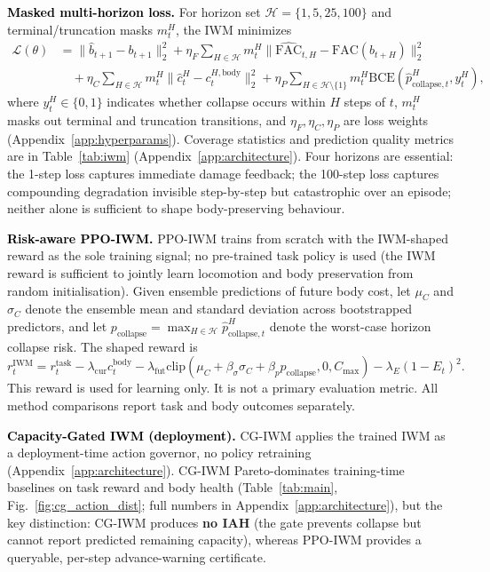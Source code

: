 \documentclass{article}
\newcommand{\methodsec}[1]{\noindent\textcolor{black}{\textbf{#1}}\enspace}
\newcommand{\fac}{\mathrm{FAC}}
\newcommand{\body}{b}
\newcommand{\bodycost}{c^{\mathrm{body}}}
\newcommand{\task}{r^{\mathrm{task}}}
\begin{document}
{\methodsec{Masked multi-horizon loss.}
For horizon set $\mathcal{H}=\{1,5,25,100\}$ and terminal/truncation masks $m^H_t$, the IWM minimizes
\begin{align}
    \mathcal{L}(\theta)
    &=
    \|\hat{\body}_{t+1}-\body_{t+1}\|_2^2
    + \eta_F \sum_{H\in\mathcal{H}} m^H_t
    \|\widehat{\fac}_{t,H}-\fac(\body_{t+H})\|_2^2 \nonumber\\
    &\quad
    + \eta_C \sum_{H\in\mathcal{H}} m^H_t
    \|\hat c^{H}_{t}-c^{H,\mathrm{body}}_{t}\|_2^2
    + \eta_P \sum_{H\in\mathcal{H}\setminus\{1\}} m^H_t
    \mathrm{BCE}(\hat p^{H}_{\mathrm{collapse},t}, y^H_t),
\end{align}
where $y^H_t \in \{0,1\}$ indicates whether collapse occurs within $H$ steps of $t$, $m^H_t$ masks out terminal and truncation transitions, and $\eta_F,\eta_C,\eta_P$ are loss weights (Appendix~\ref{app:hyperparams}). Coverage statistics and prediction quality metrics are in Table~\ref{tab:iwm} (Appendix~\ref{app:architecture}).
Four horizons are essential: the 1-step loss captures immediate damage feedback; the 100-step loss captures compounding degradation invisible step-by-step but catastrophic over an episode; neither alone is sufficient to shape body-preserving behaviour.

\methodsec{Risk-aware PPO-IWM.}
PPO-IWM trains from scratch with the IWM-shaped reward as the sole training signal; no pre-trained task policy is used (the IWM reward is sufficient to jointly learn locomotion and body preservation from random initialisation). Given ensemble predictions of future body cost, let $\mu_C$ and $\sigma_C$ denote the ensemble mean and standard deviation across bootstrapped predictors, and let $p_{\mathrm{collapse}} = \max_{H\in\mathcal{H}} \hat{p}^H_{\mathrm{collapse},t}$ denote the worst-case horizon collapse risk.  The shaped reward is
\begin{equation}
    r_t^{\mathrm{IWM}}
    =
    \task_t
   - \lambda_{\mathrm{cur}}\bodycost_t
   - \lambda_{\mathrm{fut}}
    \mathrm{clip}\left(
    \mu_C + \beta_\sigma \sigma_C + \beta_p p_{\mathrm{collapse}},
    0, C_{\max}\right)
   - \lambda_E(1-E_t)^2 .
\end{equation}
This reward is used for learning only.  It is not a primary evaluation metric. All method comparisons report task and body outcomes separately.


\methodsec{Capacity-Gated IWM (deployment).}
CG-IWM applies the trained IWM as a deployment-time action governor, no policy retraining (Appendix~\ref{app:architecture}).
CG-IWM Pareto-dominates training-time baselines on task reward and body health (Table~\ref{tab:main}, Fig.~\ref{fig:cg_action_dist}; full numbers in Appendix~\ref{app:architecture}), but the key distinction: CG-IWM produces \textbf{no IAH} (the gate prevents collapse but cannot report predicted remaining capacity), whereas PPO-IWM provides a queryable, per-step advance-warning certificate.

}
\end{document}
